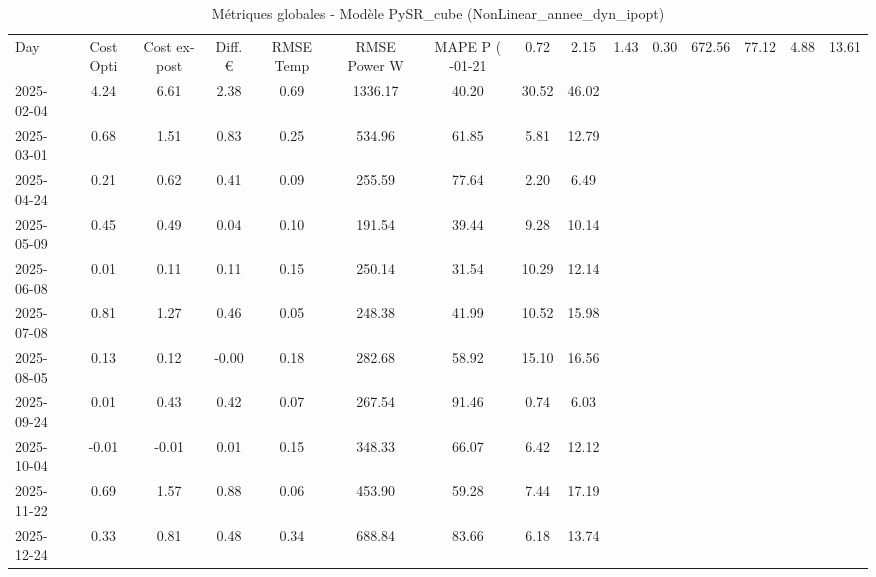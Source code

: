 \begin{table}
\caption{Métriques globales - Modèle PySR_cube (NonLinear_annee_dyn_ipopt)}
\label{tab:PySR_cube_NonLinear_annee_dyn_ipopt_Validation_EPlus_VS_Opti}
\begin{small}
\begin{tabular}{lcccccccc}
\toprule
Day & Cost Opti & Cost ex-post & Diff. € & RMSE Temp & RMSE Power W & MAPE P (%
-01-21 & 0.72 & 2.15 & 1.43 & 0.30 & 672.56 & 77.12 & 4.88 & 13.61 \\
2025-02-04 & 4.24 & 6.61 & 2.38 & 0.69 & 1336.17 & 40.20 & 30.52 & 46.02 \\
2025-03-01 & 0.68 & 1.51 & 0.83 & 0.25 & 534.96 & 61.85 & 5.81 & 12.79 \\
2025-04-24 & 0.21 & 0.62 & 0.41 & 0.09 & 255.59 & 77.64 & 2.20 & 6.49 \\
2025-05-09 & 0.45 & 0.49 & 0.04 & 0.10 & 191.54 & 39.44 & 9.28 & 10.14 \\
2025-06-08 & 0.01 & 0.11 & 0.11 & 0.15 & 250.14 & 31.54 & 10.29 & 12.14 \\
2025-07-08 & 0.81 & 1.27 & 0.46 & 0.05 & 248.38 & 41.99 & 10.52 & 15.98 \\
2025-08-05 & 0.13 & 0.12 & -0.00 & 0.18 & 282.68 & 58.92 & 15.10 & 16.56 \\
2025-09-24 & 0.01 & 0.43 & 0.42 & 0.07 & 267.54 & 91.46 & 0.74 & 6.03 \\
2025-10-04 & -0.01 & -0.01 & 0.01 & 0.15 & 348.33 & 66.07 & 6.42 & 12.12 \\
2025-11-22 & 0.69 & 1.57 & 0.88 & 0.06 & 453.90 & 59.28 & 7.44 & 17.19 \\
2025-12-24 & 0.33 & 0.81 & 0.48 & 0.34 & 688.84 & 83.66 & 6.18 & 13.74 \\
\bottomrule
\end{tabular}
\end{small}
\end{table}
